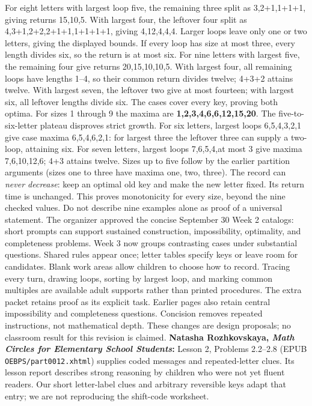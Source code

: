 \documentclass[11pt]{article}
\begin{document}
For eight letters with largest loop five, the remaining three split as 3,2+1,1+1+1, giving returns 15,10,5. With largest four, the leftover four split as 4,3+1,2+2,2+1+1,1+1+1+1, giving 4,12,4,4,4. Larger loops leave only one or two letters, giving the displayed bounds. If every loop has size at most three, every length divides six, so the return is at most six.
For nine letters with largest five, the remaining four give returns 20,15,10,10,5. With largest four, all remaining loops have lengths 1--4, so their common return divides twelve; 4+3+2 attains twelve. With largest seven, the leftover two give at most fourteen; with largest six, all leftover lengths divide six. The cases cover every key, proving both optima.
For sizes 1 through 9 the maxima are \textbf{1,2,3,4,6,6,12,15,20}. The five-to-six-letter plateau disproves strict growth. For six letters, largest loops 6,5,4,3,2,1 give case maxima 6,5,4,6,2,1: for largest three the leftover three can supply a two-loop, attaining six. For seven letters, largest loops 7,6,5,4,at most 3 give maxima 7,6,10,12,6; 4+3 attains twelve. Sizes up to five follow by the earlier partition arguments (sizes one to three have maxima one, two, three).
The record can \emph{never decrease}: keep an optimal old key and make the new letter fixed. Its return time is unchanged. This proves monotonicity for every size, beyond the nine checked values. Do not describe nine examples alone as proof of a universal statement.
\newpage
{}
The organizer approved the concise September 30 Week 2 catalogs: short prompts can support sustained construction, impossibility, optimality, and completeness problems. Week 3 now groups contrasting cases under substantial questions. Shared rules appear once; letter tables specify keys or leave room for candidates. Blank work areas allow children to choose how to record. Tracing every turn, drawing loops, sorting by largest loop, and marking common multiples are available adult supports rather than printed procedures.
The extra packet retains proof as its explicit task. Earlier pages also retain central impossibility and completeness questions. Concision removes repeated instructions, not mathematical depth. These changes are design proposals; no classroom result for this revision is claimed.
\textbf{Natasha Rozhkovskaya, \emph{Math Circles for Elementary School Students}:} Lesson 2, Problems 2.2--2.8 (EPUB \texttt{OEBPS/}\allowbreak\texttt{part0012.xhtml}) supplies coded messages and repeated-letter clues. Its lesson report describes strong reasoning by children who were not yet fluent readers. Our short letter-label clues and arbitrary reversible keys adapt that entry; we are not reproducing the shift-code worksheet.
\end{document}
